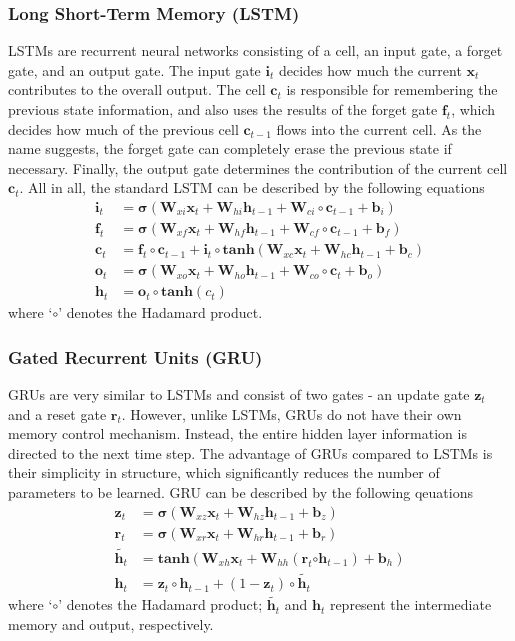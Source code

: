 \documentclass[runningheads]{llncs}
\begin{document}
\subsubsection{Long Short-Term Memory (LSTM)}
LSTMs \cite{hochreiter1997long} are recurrent neural networks consisting of a cell, an input gate, a forget gate, and an output gate. The input gate $\bm i_t$ decides how much the current $\bm x_t$ contributes to the overall output. The cell $\bm c_t$ is responsible for remembering the previous state information, and also uses the results of the forget gate $\bm f_t$, which decides how much of the previous cell $\bm c_{t-1}$ flows into the current cell. 
As the name suggests, the forget gate can completely erase the previous state if necessary. Finally, the output gate determines the contribution of the current cell $\bm c_t$. All in all, the standard LSTM can be described by the following equations
\begin{align*}
    \bm i_t &= \bm \sigma \left( \bm W_{xi}\bm x_t + \bm W_{hi}\bm h_{t-1} + \bm W_{ci} \circ \bm c_{t-1} + \bm b_i \right) \\
    \bm f_t &= \bm \sigma \left( \bm W_{xf}\bm x_t + \bm W_{hf}\bm h_{t-1} + \bm W_{cf} \circ \bm c_{t-1} + \bm b_f \right) \\
    \bm c_t &= \bm f_t \circ \bm c_{t-1} + \bm i_t \circ \textbf{tanh}\left(\bm W_{xc}\bm x_t + \bm W_{hc}\bm h_{t-1} + \bm b_c \right) \\
    \bm o_t &= \bm \sigma \left( \bm W_{xo}\bm x_t + \bm W_{ho}\bm h_{t-1} + \bm W_{co} \circ \bm c_{t} + \bm b_o \right) \\
    \bm h_t &= \bm o_t \circ \textbf{tanh}\left(c_t \right)
\end{align*}
\noindent where `$\circ$' denotes the Hadamard product.

\subsubsection{Gated Recurrent Units (GRU)}
GRUs \cite{cho2014properties} are very similar to LSTMs and consist of two gates - an update gate $\bm z_t$ and a reset gate $\bm r_t$. However, unlike LSTMs, GRUs do not have their own memory control mechanism. Instead, the entire hidden layer information is directed to the next time step. The advantage of GRUs compared to LSTMs is their simplicity in structure, which significantly reduces the number of parameters to be learned. GRU can be described by the following qeuations
\begin{align*}
    \bm z_t &= \bm \sigma \left( \bm W_{xz}\bm x_t + \bm W_{hz}\bm h_{t-1} + \bm b_z \right) \\
    \bm r_t &= \bm \sigma \left( \bm W_{xr}\bm x_t + \bm W_{hr}\bm h_{t-1} + \bm b_r \right) \\
    \tilde{\bm h_t} &= \textbf{tanh}\left(\bm W_{xh}\bm x_t + \bm W_{hh}(\bm r_{t}\bm \circ \bm h_{t-1}) + \bm b_h \right) \\
    \bm h_t &= \bm z_t \circ \bm h_{t-1} + (1 - \bm z_t) \circ \tilde{\bm h_t}
\end{align*}
\noindent where `$\circ$' denotes the Hadamard product; $\tilde{\bm h_t}$ and $\bm h_t$ represent the intermediate memory and output, respectively.
\end{document}
